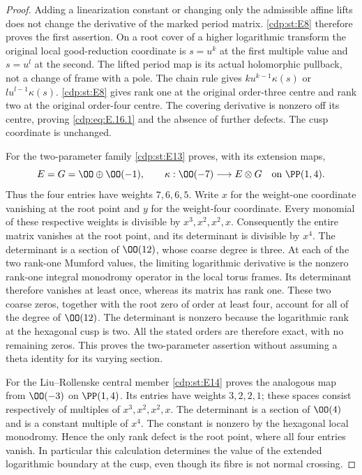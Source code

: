 \begin{proof}
Adding a linearization constant or changing only the admissible affine lifts does not change the derivative of the marked period matrix. \ref{cdp:st:E8} therefore proves the first assertion. On a root cover of a higher logarithmic transform the original local good-reduction coordinate is $s=u^k$ at the first multiple value and $s=u^l$ at the second. The lifted period map is its actual holomorphic pullback, not a change of frame with a pole. The chain rule gives $k u^{k-1}\kappa(s)$ or $l u^{l-1}\kappa(s)$. \ref{cdp:st:E8} gives rank one at the original order-three centre and rank two at the original order-four centre. The covering derivative is nonzero off its centre, proving \eqref{cdp:eq:E.16.1} and the absence of further defects. The cusp coordinate is unchanged.

For the two-parameter family \ref{cdp:st:E13} proves, with its extension maps,
\[
 E=G=\OO\oplus\OO(-1),\qquad
 \kappa:\OO(-7)\longrightarrow E\otimes G
 \quad\text{on }\PP(1,4).
\]
Thus the four entries have weights $7,6,6,5$. Write $x$ for the weight-one coordinate vanishing at the root point and $y$ for the weight-four coordinate. Every monomial of these respective weights is divisible by $x^3,x^2,x^2,x$. Consequently the entire matrix vanishes at the root point, and its determinant is divisible by $x^4$. The determinant is a section of $\OO(12)$, whose coarse degree is three. At each of the two rank-one Mumford values, the limiting logarithmic derivative is the nonzero rank-one integral monodromy operator in the local torus frames. Its determinant therefore vanishes at least once, whereas its matrix has rank one. These two coarse zeros, together with the root zero of order at least four, account for all of the degree of $\OO(12)$. The determinant is nonzero because the logarithmic rank at the hexagonal cusp is two. All the stated orders are therefore exact, with no remaining zeros. This proves the two-parameter assertion without assuming a theta identity for its varying section.

For the Liu--Rollenske central member \ref{cdp:st:E14} proves the analogous map from $\OO(-3)$ on $\PP(1,4)$. Its entries have weights $3,2,2,1$; these spaces consist respectively of multiples of $x^3,x^2,x^2,x$. The determinant is a section of $\OO(4)$ and is a constant multiple of $x^4$. The constant is nonzero by the hexagonal local monodromy. Hence the only rank defect is the root point, where all four entries vanish. In particular this calculation determines the value of the extended logarithmic boundary at the cusp, even though its fibre is not normal crossing.


\end{proof}
